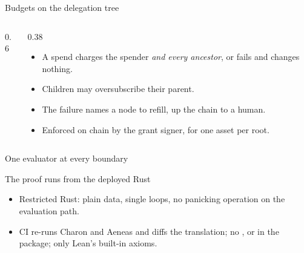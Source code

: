 \documentclass[aspectratio=169,11pt]{beamer}
\begin{document}
\begin{frame}{Budgets on the delegation tree}
  \begin{columns}[c]
    \begin{column}{0.6\linewidth}
      \centering
      \resizebox{\linewidth}{!}{}
    \end{column}
    \begin{column}{0.38\linewidth}
      \small
      \begin{itemize}
        \item A spend charges the spender \emph{and every ancestor}, or fails
          and changes nothing.
        \item Children may oversubscribe their parent.
        \item The failure names a node to refill, up the chain to a human.
        \item Enforced on chain by the grant signer, for one asset per root.
      \end{itemize}
    \end{column}
  \end{columns}
\end{frame}

\begin{frame}{One evaluator at every boundary}
  \centering
  \resizebox{!}{0.8\textheight}{}
\end{frame}

\begin{frame}{The proof runs from the deployed Rust}
  \centering
  \resizebox{\linewidth}{!}{}
  \par\medskip\small\raggedright
  \begin{itemize}
    \item Restricted Rust: plain data, single  loops, no panicking
      operation on the evaluation path.
    \item CI re-runs Charon and Aeneas and diffs the
      translation; no ,  or
       in the package; only
      Lean's built-in axioms.
  \end{itemize}
\end{frame}
\end{document}
